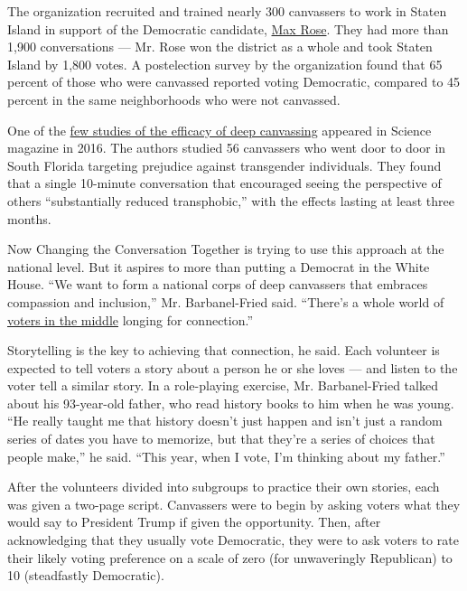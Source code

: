 The organization recruited and trained nearly 300 canvassers to work in
Staten Island in support of the Democratic candidate,
\href{https://www.nytimes.com/2018/11/07/nyregion/what-max-rose-can-teach-democrats-about-beating-republicans.html}{Max
Rose}. They had more than 1,900 conversations --- Mr. Rose won the
district as a whole and took Staten Island by 1,800 votes. A
postelection survey by the organization found that 65 percent of those
who were canvassed reported voting Democratic, compared to 45 percent in
the same neighborhoods who were not canvassed.

One of the
\href{https://science.sciencemag.org/content/352/6282/220.full}{few
studies of the efficacy of deep canvassing} appeared in Science magazine
in 2016. The authors studied 56 canvassers who went door to door in
South Florida targeting prejudice against transgender individuals. They
found that a single 10-minute conversation that encouraged seeing the
perspective of others ``substantially reduced transphobic,'' with the
effects lasting at least three months.

Now Changing the Conversation Together is trying to use this approach at
the national level. But it aspires to more than putting a Democrat in
the White House. ``We want to form a national corps of deep canvassers
that embraces compassion and inclusion,'' Mr. Barbanel-Fried said.
``There's a whole world of
\href{https://www.nytimes.com/2020/06/29/us/politics/trump-swing-voters.html}{voters
in the middle} longing for connection.''

Storytelling is the key to achieving that connection, he said. Each
volunteer is expected to tell voters a story about a person he or she
loves --- and listen to the voter tell a similar story. In a
role-playing exercise, Mr. Barbanel-Fried talked about his 93-year-old
father, who read history books to him when he was young. ``He really
taught me that history doesn't just happen and isn't just a random
series of dates you have to memorize, but that they're a series of
choices that people make,'' he said. ``This year, when I vote, I'm
thinking about my father.''

After the volunteers divided into subgroups to practice their own
stories, each was given a two-page script. Canvassers were to begin by
asking voters what they would say to President Trump if given the
opportunity. Then, after acknowledging that they usually vote
Democratic, they were to ask voters to rate their likely voting
preference on a scale of zero (for unwaveringly Republican) to 10
(steadfastly Democratic).

